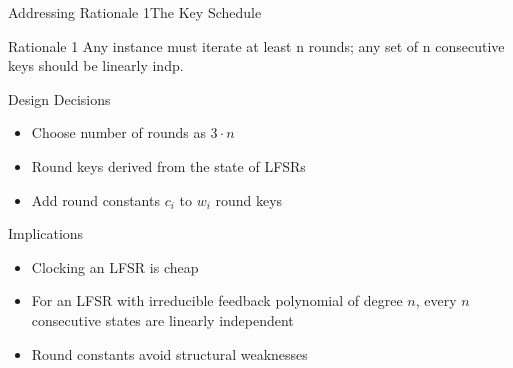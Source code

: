\begin{frame}{Addressing Rationale 1}{The Key Schedule}
    \vspace{-60pt}
    \begin{minipage}{0.985\textwidth}
    \begin{exampleblock}{Rationale 1}
        Any instance must iterate at least n rounds; any set of n consecutive keys should be linearly indp.
    \end{exampleblock}
    \end{minipage}

    \begin{minipage}[t][85pt][t]{0.47\textwidth}
        \begin{block}{Design Decisions}
            \begin{itemize}
                \item Choose number of rounds as $3 \cdot n$\\[5pt]
                \item Round keys derived from the state of LFSRs\\[5pt]
                \item Add round constants $c_i$ to $w_i$ round keys
            \end{itemize}
        \end{block}
    \end{minipage}
    \hfill
    \begin{minipage}[t][85pt][t]{0.47\textwidth}
        \begin{block}{Implications}
            \begin{itemize}
                \item Clocking an LFSR is cheap
                \item For an LFSR with irreducible feedback polynomial of degree $n$, every $n$ consecutive states are linearly independent
                \item Round constants avoid structural weaknesses
            \end{itemize}
        \end{block}
    \end{minipage}
\end{frame}
